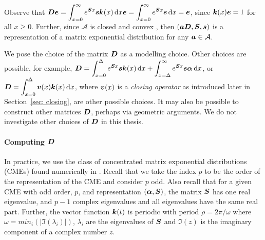 Observe that \(\boldsymbol D\boldsymbol e = \displaystyle \int_{x=0}^\infty e^{\boldsymbol S x }\boldsymbol s \boldsymbol k(x)\, \mathrm{d} x\boldsymbol e =\displaystyle \int_{x=0}^\infty e^{\boldsymbol S x }\boldsymbol s \, \mathrm{d} x=\boldsymbol e\), since \(\boldsymbol k(x)\boldsymbol e = 1\) for all \(x\geq 0\). Further, since \(\mathcal A\) is closed and convex \citep{MEinAP}, then \((\boldsymbol a \boldsymbol D,\boldsymbol S,\boldsymbol s)\) is a representation of a matrix exponential distribution for any \(\boldsymbol a\in\mathcal A\). 

We pose the choice of the matrix \(\boldsymbol D\) as a modelling choice. Other choices are possible, for example, \(\displaystyle \boldsymbol D = \int_{x=0}^{\Delta}e^{\boldsymbol S x }\boldsymbol s \boldsymbol k(x)\, \mathrm{d} x + \int_{x=\Delta}^\infty e^{\boldsymbol S x }\boldsymbol s\boldsymbol \alpha \, \mathrm{d} x\), or \(\displaystyle \boldsymbol D = \int_{x=0}^{\Delta}\boldsymbol v(x) \boldsymbol k(x)\, \mathrm{d} x\), where \(\boldsymbol v(x)\) is a \emph{closing operator} as introduced later in Section~\ref{sec: closing}, are other possible choices. It may also be possible to construct other matrices \(\boldsymbol D\), perhaps via geometric arguments. We do not investigate other choices of \(\boldsymbol D\) in this thesis.

\paragraph{Computing \(\boldsymbol D\)}
In practice, we use the class of concentrated matrix exponential distributions (CMEs) found numerically in \citep{hht2020}. Recall that we take the index \(p\) to be the order of the representation of the CME and consider \(p\) odd. Also recall that for a given CME with odd order, \(p\), and representation \((\boldsymbol\alpha,\boldsymbol S)\), the matrix \(\boldsymbol S\) has one real eigenvalue, and \(p-1\) complex eigenvalues and all eigenvalues have the same real part. Further, the vector function \(\boldsymbol k(t)\) is periodic with period \(\rho = 2\pi/\omega\) where \(\omega=min_i(|\Im(\lambda_i)|)\), \(\lambda_i\) are the eigenvalues of \(\boldsymbol{S}\) and \(\Im(z)\) is the imaginary component of a complex number \(z\). 


